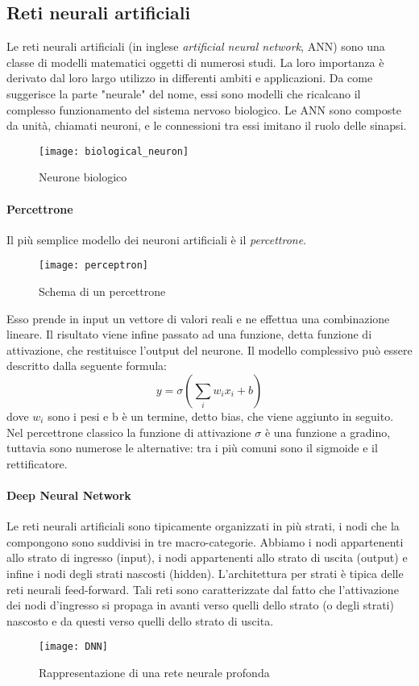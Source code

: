 \subsection{Reti neurali artificiali}
Le reti neurali artificiali (in inglese \textit{artificial neural network}, ANN) sono una classe di modelli matematici oggetti di numerosi studi. La loro importanza è derivato dal loro largo utilizzo in differenti ambiti e applicazioni. Da come suggerisce la parte "neurale" del nome, essi sono modelli che ricalcano il complesso funzionamento del sistema nervoso biologico. Le ANN sono composte da unità, chiamati neuroni, e le connessioni tra essi imitano il ruolo delle sinapsi.
\begin{figure}[ht]
    \centering
    \texttt{[image: biological\_neuron]}
    \caption[Neurone biologico]{Neurone biologico}
\end{figure}
\paragraph{Percettrone}
Il più semplice modello dei neuroni artificiali è il \textit{percettrone}. 
\begin{figure}[ht]
    \centering
    \texttt{[image: perceptron]}
    \caption[Percettrone]{Schema di un percettrone}
\end{figure}
Esso prende in input un vettore di valori reali e ne effettua una combinazione lineare. Il risultato viene infine passato ad una funzione, detta funzione di attivazione, che restituisce l'output del neurone. Il modello complessivo può essere descritto dalla seguente formula: 
$$y=\sigma(\sum_{i} w_{i}x_{i}+b)$$
dove $w_{i}$ sono i pesi e b è un termine, detto bias, che viene aggiunto in seguito. Nel percettrone classico la funzione di attivazione $\sigma$ è una funzione a gradino, tuttavia sono numerose le alternative: tra i più comuni sono il sigmoide e il rettificatore.
\paragraph{Deep Neural Network} 
Le reti neurali artificiali sono tipicamente organizzati in più strati, i nodi che la compongono sono suddivisi in tre macro-categorie. Abbiamo i nodi appartenenti allo strato di ingresso (input), i nodi appartenenti allo strato di uscita (output) e infine i nodi degli strati nascosti (hidden). L’architettura per strati è tipica delle reti neurali feed-forward. Tali reti sono caratterizzate dal fatto che l’attivazione dei nodi d’ingresso si propaga in avanti verso quelli dello strato (o degli strati) nascosto e da questi verso quelli dello strato di uscita.
\begin{figure}[ht]
    \centering
    \texttt{[image: DNN]}
    \caption[Deep Neural Network]{Rappresentazione di una rete neurale profonda}
\end{figure}

